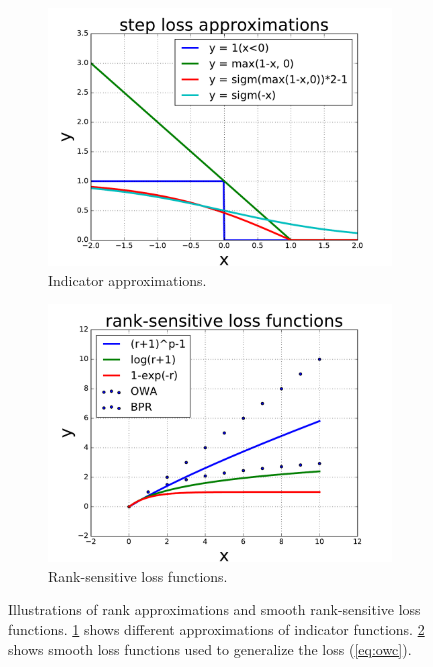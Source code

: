 \documentclass[letterpaper]{article} %
\begin{document}
%
\begin{figure}
\centering
\begin{subfigure}{.25\textwidth}
  \centering
  \includegraphics[width=.99\linewidth]{pics/rapp-eps-converted-to}
  \caption{Indicator approximations.}
  \label{fig:rapp}
\end{subfigure}%
\begin{subfigure}{.25\textwidth}
  \centering
  \includegraphics[width=.99\linewidth]{pics/rsl-eps-converted-to}
  \caption{Rank-sensitive loss functions.}
  \label{fig:rsl}
\end{subfigure}
\caption{Illustrations of rank approximations and smooth rank-sensitive loss functions. \ref{fig:rapp} shows different approximations of indicator functions. \ref{fig:rsl} shows smooth loss functions used to generalize the loss (\ref{eq:owc}).}
\label{fig:approach}
\end{figure}
\end{document}
